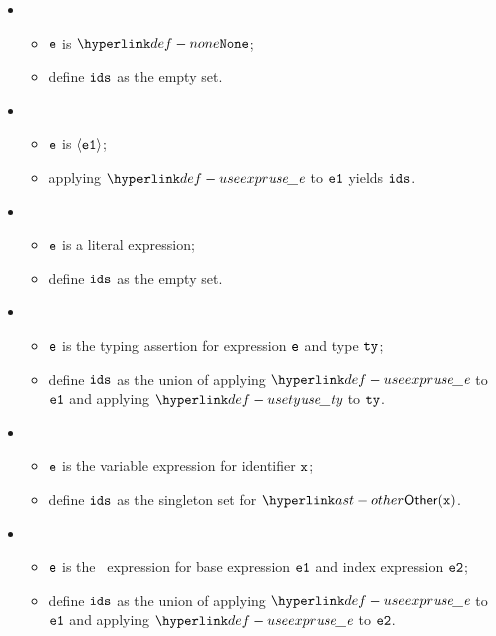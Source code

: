\ProseParagraph
\OneApplies
\begin{itemize}
  \item {}
  \begin{itemize}
    \item $\texttt{e}$ is $\None$;
    \item define $\texttt{ids}$ as the empty set.
  \end{itemize}

  \item {}
  \begin{itemize}
    \item $\texttt{e}$ is $\langle\texttt{e1}\rangle$;
    \item applying $\useexpr$ to $\texttt{e1}$ yields $\texttt{ids}$.
  \end{itemize}

  \item {}
  \begin{itemize}
    \item $\texttt{e}$ is a literal expression;
    \item define $\texttt{ids}$ as the empty set.
  \end{itemize}

  \item {}
  \begin{itemize}
    \item $\texttt{e}$ is the typing assertion for expression $\texttt{e}$ and type $\texttt{ty}$;
    \item define $\texttt{ids}$ as the union of applying $\useexpr$ to $\texttt{e1}$ and applying $\usety$ to $\texttt{ty}$.
  \end{itemize}

  \item {}
  \begin{itemize}
    \item $\texttt{e}$ is the variable expression for identifier $\texttt{x}$;
    \item define $\texttt{ids}$ as the singleton set for $\Other(\vx)$.
  \end{itemize}

  \item {}
  \begin{itemize}
    \item $\texttt{e}$ is the \arrayaccess\ expression for base expression $\texttt{e1}$ and index expression $\texttt{e2}$;
    \item define $\texttt{ids}$ as the union of applying $\useexpr$ to $\texttt{e1}$ and applying $\useexpr$ to $\texttt{e2}$.
  \end{itemize}


\end{itemize}
